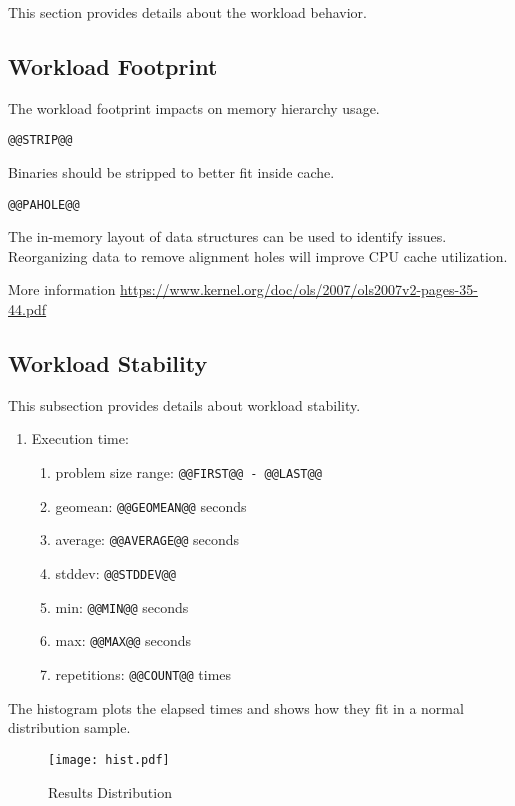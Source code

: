 \documentclass[a4paper]{article}
\begin{document}
This section provides details about the workload behavior.

\subsection{Workload Footprint}

The workload footprint impacts on memory hierarchy usage.

\begin{verbatim}
@@STRIP@@
\end{verbatim}

Binaries should be stripped to better fit inside cache.

\begin{verbatim}
@@PAHOLE@@
\end{verbatim}

The in-memory layout of data structures can be used to identify issues.
Reorganizing data to remove alignment holes will improve CPU cache utilization.

More information \url{https://www.kernel.org/doc/ols/2007/ols2007v2-pages-35-44.pdf}

\subsection{Workload Stability}

This subsection provides details about workload stability.

\begin{enumerate}
\item Execution time:
\begin{enumerate}
\item problem size range: {\tt @@FIRST@@ - @@LAST@@}
\item geomean: {\tt @@GEOMEAN@@} seconds
\item average: {\tt @@AVERAGE@@} seconds
\item stddev: {\tt @@STDDEV@@}
\item min: {\tt @@MIN@@} seconds
\item max: {\tt @@MAX@@} seconds
\item repetitions: {\tt @@COUNT@@} times
\end{enumerate}
\end{enumerate}

The histogram plots the elapsed times and shows how they fit in a normal distribution sample.

\begin{figure}[H]
\label{fig:histogram}
\centering
\texttt{[image: hist.pdf]}
\caption{Results Distribution}
\end{figure}
\end{document}
